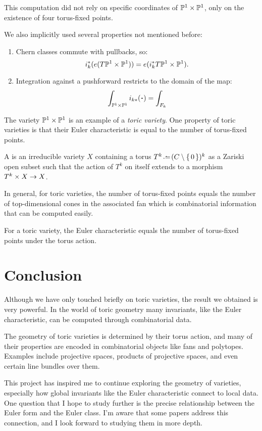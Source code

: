 \documentclass[12pt]{memoir}
\def\nextra {P}
\begin{document}
\begin{Rmk}
    This computation did not rely on specific coordinates of $\mathbb{P}^1 \times \mathbb{P}^1$, only on the existence of four torus-fixed points.\par
    We also implicitly used several properties not mentioned before:
    \begin{enumerate}
        \item Chern classes commute with pullbacks, so:
        $$i_k^\ast(e(T\mathbb{P}^1\times\mathbb{P}^1))=e(i_k^\ast T\mathbb{P}^1\times\mathbb{P}^1).$$
        \item Integration against a pushforward restricts to the domain of the map:
        $$\int_{\bP^1\x\bP^1}i_{k\ast}(\.)=\int_{F_k}$$
    \end{enumerate}
\end{Rmk}

The variety $\mathbb{P}^1 \times \mathbb{P}^1$ is an example of a \emph{toric variety}. One property of toric varieties is that their Euler characteristic is equal to the number of torus-fixed points.

\begin{Def}
    A  is an irreducible variety $X$ containing a torus $T^k\defeq(C\less\set{0})^k$ as a Zariski open subset such that the action of $T^k$ on itself extends to a morphism $T^k\times X\to X$.
\end{Def}

In general, for toric varieties, the number of torus-fixed points equals the number of top-dimensional cones in the associated fan which is combinatorial information that can be computed easily.

\begin{Th}
For a toric variety, the Euler characteristic equals the number of torus-fixed points under the torus action.
\end{Th}


\section{Conclusion}

Although we have only touched briefly on toric varieties, the result we obtained is very powerful. In the world of toric geometry many invariants, like the Euler characteristic, can be computed through combinatorial data.\par
The geometry of toric varieties is determined by their torus action, and many of their properties are encoded in combinatorial objects like fans and polytopes. Examples include projective spaces, products of projective spaces, and even certain line bundles over them.\par
This project has inspired me to continue exploring the geometry of varieties, especially how global invariants like the Euler characteristic connect to local data. One question that I hope to study further is the precise relationship between the Euler form and the Euler class. I'm aware that some papers address this connection, and I look forward to studying them in more depth.
\nocite{*}


\end{document}

